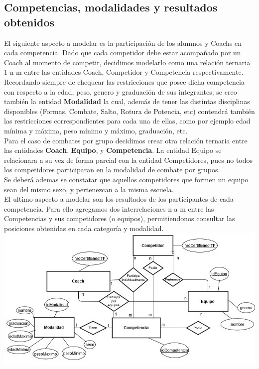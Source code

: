\newpage
\subsection{Competencias, modalidades y resultados obtenidos}

El siguiente aspecto a modelar es la participación de los alumnos y Coachs en cada competencia. Dado que cada competidor debe estar acompañado por un Coach al momento de competir, decidimos modelarlo como una relación ternaria 1-n-m entre las entidades Coach, Competidor y Competencia respectivamente. Recordando siempre de chequear las restricciones que posee dicha competencia con respecto a la edad, peso, genero y graduación de sus integrantes; se creo también la entidad \textbf{Modalidad} la cual, además de tener las distintas disciplinas disponibles (Formas, Combate, Salto, Rotura de Potencia, etc) contendrá también las restricciones correspondientes para cada una de ellas, como por ejemplo edad mínima y máxima, peso mínimo y máximo, graduación, etc. \\

Para el caso de combates por grupo decidimos crear otra relación ternaria entre las entidades \textbf{Coach}, \textbf{Equipo}, y \textbf{Competencia}. La entidad Equipo se relacionara a su vez de forma parcial con la entidad Competidores, pues no todos los competidores participaran en la modalidad de combate por grupos. \\

Se deberá ademas se constatar que aquellos competidores que formen un equipo sean del mismo sexo, y pertenezcan a la misma escuela.\\

El ultimo aspecto a modelar son los resultados de los participantes de cada competencia. Para ello agregamos dos interrelaciones n a m entre las Competencias y sus competidores (o equipos), permitiendonos consultar las posiciones obtenidas en cada categoría y modalidad.\\

\includegraphics[scale=0.75]{competenciaDiag.jpg}


